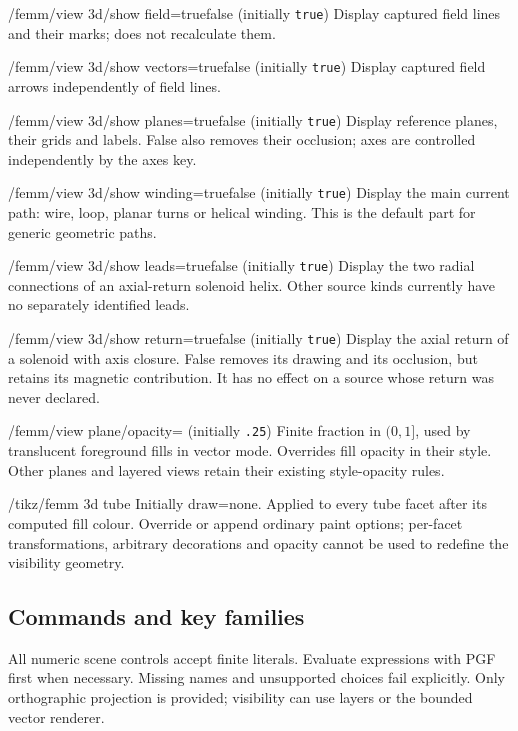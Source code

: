 \begin{key}{/femm/view 3d/show field=true\textbar false (initially \texttt{true})}
Display captured field lines and their marks; does not recalculate them.
\end{key}
\begin{key}{/femm/view 3d/show vectors=true\textbar false (initially \texttt{true})}
Display captured field arrows independently of field lines.
\end{key}
\begin{key}{/femm/view 3d/show planes=true\textbar false (initially \texttt{true})}
Display reference planes, their grids and labels. False also removes their
occlusion; axes are controlled independently by the axes key.
\end{key}
\begin{key}{/femm/view 3d/show winding=true\textbar false (initially \texttt{true})}
Display the main current path: wire, loop, planar turns or helical winding.
This is the default part for generic geometric paths.
\end{key}
\begin{key}{/femm/view 3d/show leads=true\textbar false (initially \texttt{true})}
Display the two radial connections of an axial-return solenoid helix.
Other source kinds currently have no separately identified leads.
\end{key}
\begin{key}{/femm/view 3d/show return=true\textbar false (initially \texttt{true})}
Display the axial return of a solenoid with axis closure. False removes its
drawing and its occlusion, but retains its magnetic contribution. It has no
effect on a source whose return was never declared.
\end{key}
\begin{key}{/femm/view plane/opacity= (initially \texttt{.25})}
Finite fraction in $(0,1]$, used by translucent foreground fills in vector
mode. Overrides fill opacity in their style. Other planes and layered views
retain their existing style-opacity rules.
\end{key}
\begin{key}{/tikz/femm 3d tube}
Initially draw=none. Applied to every tube facet after its computed fill colour.
Override or append ordinary paint options; per-facet transformations, arbitrary
decorations and opacity cannot be used to redefine the visibility geometry.
\end{key}

\subsection{Commands and key families}
All numeric scene controls accept finite literals. Evaluate expressions with
PGF first when necessary. Missing names and unsupported choices fail explicitly.
Only orthographic projection is provided; visibility can use layers or the bounded vector renderer.

